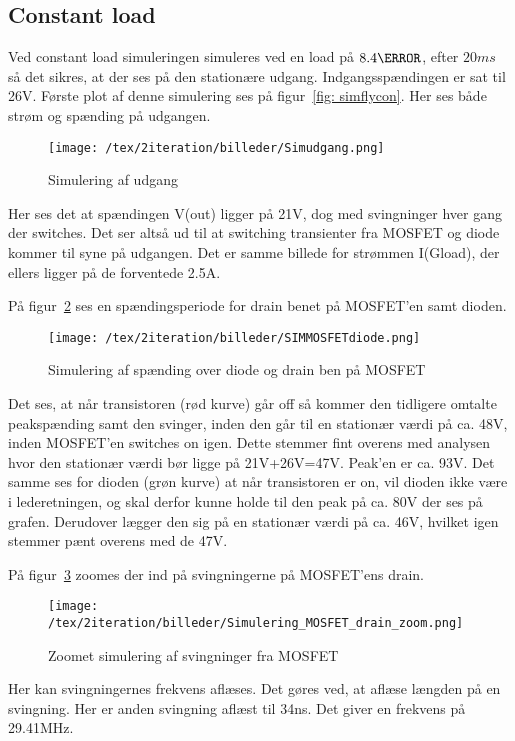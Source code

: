 

\subsection{Constant load} \label{constant}
Ved constant load simuleringen simuleres ved en load på $8.4\ohm$, efter $20ms$ så det sikres, at der ses på den stationære udgang. Indgangsspændingen er sat til 26V.
Første plot af denne simulering ses på figur~\ref{fig: simflycon}. Her ses både strøm og spænding på udgangen.
\begin{figure}[H]
	\center
	\texttt{[image: /tex/2iteration/billeder/Simudgang.png]}
	\caption{Simulering af udgang}
	\label{fig: simudgang}
\end{figure}
Her ses det at spændingen V(out) ligger på 21V, dog med svingninger hver gang der switches. Det ser altså ud til at switching transienter fra MOSFET og diode kommer til syne på udgangen. Det er samme billede for strømmen I(Gload), der ellers ligger på de forventede 2.5A.

På figur~\ref{fig: simMOSdio} ses en spændingsperiode for drain benet på MOSFET'en samt dioden. 
\begin{figure}[H]
	\center
	\texttt{[image: /tex/2iteration/billeder/SIMMOSFETdiode.png]}
	\caption{Simulering af spænding over diode og drain ben på MOSFET}
	\label{fig: simMOSdio}
\end{figure}
Det ses, at når transistoren (rød kurve) går off så kommer den tidligere omtalte peakspænding samt den svinger, inden den går til en stationær værdi på ca. 48V, inden MOSFET'en switches on igen. Dette stemmer fint overens med analysen hvor den stationær værdi bør ligge på 21V+26V=47V.
Peak'en er ca. 93V.
Det samme ses for dioden (grøn kurve) at når transistoren er on, vil dioden ikke være i lederetningen, og skal derfor kunne holde til den peak på ca. 80V der ses på grafen. Derudover lægger den sig på en stationær værdi på ca. 46V, hvilket igen stemmer pænt overens med de 47V. 

På figur~\ref{fig: simMOSzoom} zoomes der ind på svingningerne på MOSFET'ens drain.
\begin{figure}[H]
	\center
	\texttt{[image: /tex/2iteration/billeder/Simulering\_MOSFET\_drain\_zoom.png]}
	\caption{Zoomet simulering af svingninger fra MOSFET}
	\label{fig: simMOSzoom}
\end{figure}
Her kan svingningernes frekvens aflæses. Det gøres ved, at aflæse længden på en svingning. Her er anden svingning aflæst til 34ns. Det giver en frekvens på 29.41MHz.

